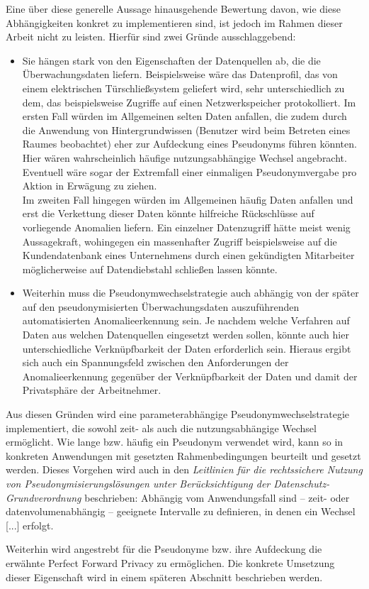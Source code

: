 Eine über diese generelle Aussage hinausgehende Bewertung davon, wie diese Abhängigkeiten konkret zu implementieren sind, ist jedoch im Rahmen dieser Arbeit nicht zu leisten. Hierfür sind zwei Gründe ausschlaggebend:
\begin{itemize}
  \item Sie hängen stark von den Eigenschaften der Datenquellen ab, die die Überwachungsdaten liefern. Beispielsweise wäre das Datenprofil, das von einem elektrischen Türschließsystem geliefert wird, sehr unterschiedlich zu dem, das beispielsweise Zugriffe auf einen Netzwerkspeicher protokolliert. Im ersten Fall würden im Allgemeinen selten Daten anfallen, die zudem durch die Anwendung von Hintergrundwissen (Benutzer wird beim Betreten eines Raumes beobachtet) eher zur Aufdeckung eines Pseudonyms führen könnten. Hier wären wahrscheinlich häufige nutzungsabhängige Wechsel angebracht. Eventuell wäre sogar der Extremfall einer einmaligen Pseudonymvergabe pro Aktion in Erwägung zu ziehen.\\
  Im zweiten Fall hingegen würden im Allgemeinen häufig Daten anfallen und erst die Verkettung dieser Daten könnte hilfreiche Rückschlüsse auf vorliegende Anomalien liefern. Ein einzelner Datenzugriff hätte meist wenig Aussagekraft, wohingegen ein massenhafter Zugriff beispielsweise auf die Kundendatenbank eines Unternehmens durch einen gekündigten Mitarbeiter möglicherweise auf Datendiebstahl schließen lassen könnte.
  
  \item Weiterhin muss die Pseudonymwechselstrategie auch abhängig von der später auf den pseudonymisierten Überwachungsdaten auszuführenden automatisierten Anomalieerkennung sein. Je nachdem welche Verfahren auf Daten aus welchen Datenquellen eingesetzt werden sollen, könnte auch hier unterschiedliche Verknüpfbarkeit der Daten erforderlich sein. Hieraus ergibt sich auch ein Spannungsfeld zwischen den Anforderungen der Anomalieerkennung gegenüber der Verknüpfbarkeit der Daten und damit der Privatsphäre der Arbeitnehmer.
\end{itemize}

Aus diesen Gründen wird eine parameterabhängige Pseudonymwechselstrategie implementiert, die sowohl zeit- als auch die nutzungsabhängige Wechsel ermöglicht. Wie lange bzw. häufig ein Pseudonym verwendet wird, kann so in konkreten Anwendungen mit gesetzten Rahmenbedingungen beurteilt und gesetzt werden.
Dieses Vorgehen wird auch in den \textit{Leitlinien für die rechtssichere Nutzung von Pseudonymisierungslösungen unter Berücksichtigung der Datenschutz-Grundverordnung} beschrieben: \glqq Abhängig vom Anwendungsfall sind – zeit- oder datenvolumenabhängig – geeignete Intervalle zu definieren, in denen ein Wechsel [...] erfolgt.\grqq{}\cite{schwartmann2017}

Weiterhin wird angestrebt für die Pseudonyme bzw. ihre Aufdeckung die erwähnte Perfect Forward Privacy zu ermöglichen. Die konkrete Umsetzung dieser Eigenschaft wird in einem späteren Abschnitt beschrieben werden.

